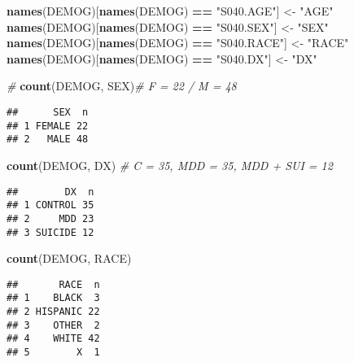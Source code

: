 \documentclass[]{article}
\newenvironment{Shaded}{\begin{snugshade}}{\end{snugshade}}
\newcommand{\CommentTok}[1]{\textcolor[rgb]{0.56,0.35,0.01}{\textit{#1}}}
\newcommand{\DataTypeTok}[1]{\textcolor[rgb]{0.13,0.29,0.53}{#1}}
\newcommand{\DecValTok}[1]{\textcolor[rgb]{0.00,0.00,0.81}{#1}}
\newcommand{\KeywordTok}[1]{\textcolor[rgb]{0.13,0.29,0.53}{\textbf{#1}}}
\newcommand{\NormalTok}[1]{#1}
\newcommand{\OperatorTok}[1]{\textcolor[rgb]{0.81,0.36,0.00}{\textbf{#1}}}
\newcommand{\StringTok}[1]{\textcolor[rgb]{0.31,0.60,0.02}{#1}}
\begin{document}
\begin{Shaded}
\begin{Highlighting}[]
\KeywordTok{names}\NormalTok{(DEMOG)[}\KeywordTok{names}\NormalTok{(DEMOG) }\OperatorTok{==}\StringTok{ "S040.AGE"}\NormalTok{] <-}\StringTok{ "AGE"}
\KeywordTok{names}\NormalTok{(DEMOG)[}\KeywordTok{names}\NormalTok{(DEMOG) }\OperatorTok{==}\StringTok{ "S040.SEX"}\NormalTok{] <-}\StringTok{ "SEX"}
\KeywordTok{names}\NormalTok{(DEMOG)[}\KeywordTok{names}\NormalTok{(DEMOG) }\OperatorTok{==}\StringTok{ "S040.RACE"}\NormalTok{] <-}\StringTok{ "RACE"}
\KeywordTok{names}\NormalTok{(DEMOG)[}\KeywordTok{names}\NormalTok{(DEMOG) }\OperatorTok{==}\StringTok{ "S040.DX"}\NormalTok{] <-}\StringTok{ "DX"}

\CommentTok{#}
\KeywordTok{count}\NormalTok{(DEMOG, SEX)}\CommentTok{# F = 22 / M = 48}
\end{Highlighting}
\end{Shaded}

\begin{verbatim}
##      SEX  n
## 1 FEMALE 22
## 2   MALE 48
\end{verbatim}

\begin{Shaded}
\begin{Highlighting}[]
\KeywordTok{count}\NormalTok{(DEMOG, DX) }\CommentTok{# C = 35, MDD = 35, MDD + SUI = 12}
\end{Highlighting}
\end{Shaded}

\begin{verbatim}
##        DX  n
## 1 CONTROL 35
## 2     MDD 23
## 3 SUICIDE 12
\end{verbatim}

\begin{Shaded}
\begin{Highlighting}[]
\KeywordTok{count}\NormalTok{(DEMOG, RACE)}
\end{Highlighting}
\end{Shaded}

\begin{verbatim}
##       RACE  n
## 1    BLACK  3
## 2 HISPANIC 22
## 3    OTHER  2
## 4    WHITE 42
## 5        X  1
\end{verbatim}

\begin{Shaded}
\end{Shaded}
\end{document}
